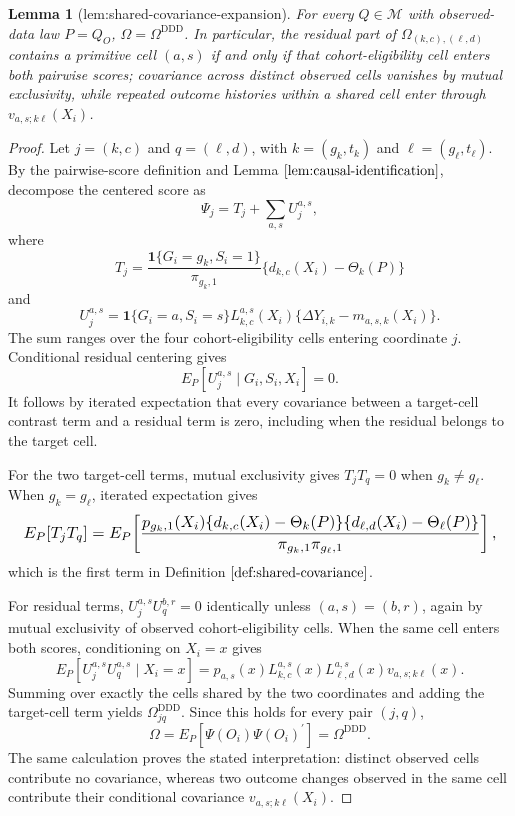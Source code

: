 \documentclass{article}
\newtheorem{lemma}{Lemma}
\begin{document}
\begin{lemma}[lem:shared-covariance-expansion]\label{lem:shared-covariance-expansion}
For every \(Q\in\mathcal M\) with observed-data law \(P=Q_O\), \(\Omega=\Omega^{\mathrm{DDD}}\). In particular, the residual part of \(\Omega_{(k,c),(\ell,d)}\) contains a primitive cell \((a,s)\) if and only if that cohort-eligibility cell enters both pairwise scores; covariance across distinct observed cells vanishes by mutual exclusivity, while repeated outcome histories within a shared cell enter through \(v_{a,s;k\ell}(X_i)\).
\end{lemma}
\begin{proof}
Let \(j=(k,c)\) and \(q=(\ell,d)\), with \(k=(g_k,t_k)\) and \(\ell=(g_\ell,t_\ell)\). By the pairwise-score definition and Lemma \(\ref{lem:causal-identification}\), decompose the centered score as
\[
 \Psi_j=T_j+\sum_{a,s}U_j^{a,s},
\]
where
\[
 T_j=\frac{\mathbf 1\{G_i=g_k,S_i=1\}}{\pi_{g_k,1}}
       \{d_{k,c}(X_i)-\Theta_k(P)\}
\]
and
\[
 U_j^{a,s}=\mathbf 1\{G_i=a,S_i=s\}L_{k,c}^{a,s}(X_i)
       \{\Delta Y_{i,k}-m_{a,s,k}(X_i)\}.
\]
The sum ranges over the four cohort-eligibility cells entering coordinate \(j\). Conditional residual centering gives
\[
 E_P[U_j^{a,s}\mid G_i,S_i,X_i]=0.
\]
It follows by iterated expectation that every covariance between a target-cell contrast term and a residual term is zero, including when the residual belongs to the target cell.

For the two target-cell terms, mutual exclusivity gives \(T_jT_q=0\) when \(g_k\ne g_\ell\). When \(g_k=g_\ell\), iterated expectation gives
\[
\makebox[\linewidth][c]{\resizebox{0.98\linewidth}{!}{\(\displaystyle E_P[T_jT_q]
 =E_P\!\left[
 \frac{p_{g_k,1}(X_i)
 \{d_{k,c}(X_i)-\Theta_k(P)\}
 \{d_{\ell,d}(X_i)-\Theta_\ell(P)\}}
 {\pi_{g_k,1}\pi_{g_\ell,1}}
 \right],\)}}
\]
which is the first term in Definition \(\ref{def:shared-covariance}\).

For residual terms, \(U_j^{a,s}U_q^{b,r}=0\) identically unless \((a,s)=(b,r)\), again by mutual exclusivity of observed cohort-eligibility cells. When the same cell enters both scores, conditioning on \(X_i=x\) gives
\[
 E_P[U_j^{a,s}U_q^{a,s}\mid X_i=x]
 =p_{a,s}(x)L_{k,c}^{a,s}(x)L_{\ell,d}^{a,s}(x)
   v_{a,s;k\ell}(x).
\]
Summing over exactly the cells shared by the two coordinates and adding the target-cell term yields \(\Omega^{\mathrm{DDD}}_{jq}\). Since this holds for every pair \((j,q)\),
\[
 \Omega=E_P[\Psi(O_i)\Psi(O_i)^{\prime}]=\Omega^{\mathrm{DDD}}.
\]
The same calculation proves the stated interpretation: distinct observed cells contribute no covariance, whereas two outcome changes observed in the same cell contribute their conditional covariance \(v_{a,s;k\ell}(X_i)\).
\end{proof}
\end{document}
